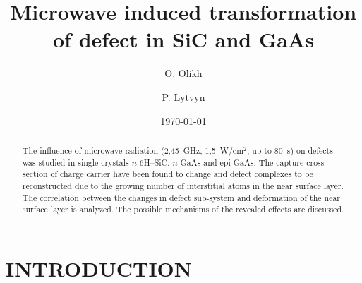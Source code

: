 \documentclass[%
 aip,jap,
 amsmath,amssymb,
 reprint,%
]{revtex4-1}
\begin{document}
\title[]{Microwave induced transformation of defect in SiC and GaAs}
\author{O. Olikh}
\author{P. Lytvyn}%
%

\date{\today}%

\begin{abstract}
The influence of microwave radiation (2,45~GHz, 1,5~W/cm$^2$, up to 80~s) on defects was studied in single crystals $n$-6H–SiC, $n$-GaAs and epi-GaAs.
The capture cross-section of charge carrier have been found to change
and defect complexes to be reconstructed due to the growing number of  interstitial atoms in the near surface layer.
The correlation between the changes in defect sub-system and deformation of the near surface layer is analyzed.
The possible mechanisms of the revealed effects are discussed.
\end{abstract}


\maketitle


\section{\label{sec:Int}INTRODUCTION}
\end{document}

